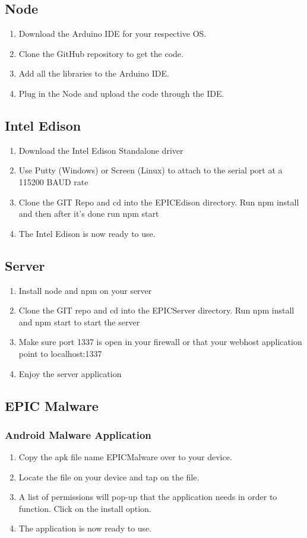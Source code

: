\documentclass{article}
\begin{document}
\subsection{Node}
\begin{enumerate}
\item Download the Arduino IDE for your respective OS.
\item Clone the GitHub repository to get the code.
\item Add all the libraries to the Arduino IDE.
\item Plug in the Node and upload the code through the IDE.
\end{enumerate}

\subsection{Intel Edison}
\begin{enumerate}
\item Download the Intel Edison Standalone driver
\item Use Putty (Windows) or Screen (Linux) to attach to the serial port at a 115200 BAUD rate
\item Clone the GIT Repo and cd into the EPICEdison directory. Run npm install and then after it's done run npm start
\item The Intel Edison is now ready to use.
\end{enumerate}

\subsection{Server}
\begin{enumerate}
\item Install node and npm on your server
\item Clone the GIT repo and cd into the EPICServer directory. Run npm install and npm start to start the server
\item Make sure port 1337 is open in your firewall or that your webhost application point to localhost:1337
\item Enjoy the server application
\end{enumerate}

\subsection{EPIC Malware}
\subsubsection{Android Malware Application}
\begin{enumerate}
\item Copy the apk file name EPICMalware over to your device.
\item Locate the file on your device and tap on the file.
\item A list of permissions will pop-up that the application needs in order to function. Click on the install option.
\item The application is now ready to use.
\end{enumerate}
\end{document}
